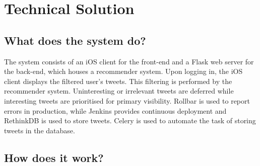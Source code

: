 \documentclass{article}
\begin{document}
\newpage
















































\section{Technical Solution} 

\subsection{What does the system do?} 

The system consists of an iOS client for the front-end and a Flask\cite{flask} web server for the back-end, which houses a recommender system. Upon logging in, the iOS client displays the filtered user's tweets. This filtering is performed by the recommender system. Uninteresting or irrelevant tweets are deferred while interesting tweets are prioritised for primary visibility. Rollbar is used to report errors in production, while Jenkins provides continuous deployment and RethinkDB is used to store tweets. Celery is used to automate the task of storing tweets in the database.




\subsection{How does it work?} 
\end{document}
